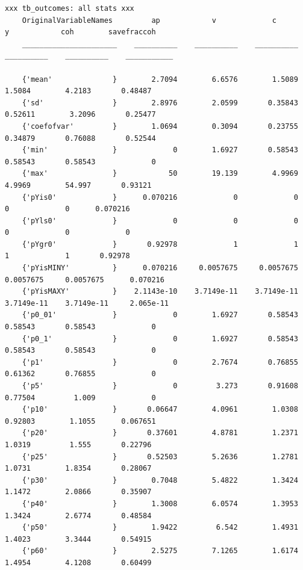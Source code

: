 \documentclass[
]{book}
\begin{document}
\begin{verbatim}
xxx tb_outcomes: all stats xxx
    OriginalVariableNames         ap            v             c             y            coh        savefraccoh
    ______________________    __________    __________    __________    __________    __________    ___________

    {'mean'              }        2.7094        6.6576        1.5089        1.5084        4.2183       0.48487 
    {'sd'                }        2.8976        2.0599       0.35843       0.52611        3.2096       0.25477 
    {'coefofvar'         }        1.0694        0.3094       0.23755       0.34879       0.76088       0.52544 
    {'min'               }             0        1.6927       0.58543       0.58543       0.58543             0 
    {'max'               }            50        19.139        4.9969        4.9969        54.997       0.93121 
    {'pYis0'             }      0.070216             0             0             0             0      0.070216 
    {'pYls0'             }             0             0             0             0             0             0 
    {'pYgr0'             }       0.92978             1             1             1             1       0.92978 
    {'pYisMINY'          }      0.070216     0.0057675     0.0057675     0.0057675     0.0057675      0.070216 
    {'pYisMAXY'          }    2.1143e-10    3.7149e-11    3.7149e-11    3.7149e-11    3.7149e-11     2.065e-11 
    {'p0_01'             }             0        1.6927       0.58543       0.58543       0.58543             0 
    {'p0_1'              }             0        1.6927       0.58543       0.58543       0.58543             0 
    {'p1'                }             0        2.7674       0.76855       0.61362       0.76855             0 
    {'p5'                }             0         3.273       0.91608       0.77504         1.009             0 
    {'p10'               }       0.06647        4.0961        1.0308       0.92803        1.1055      0.067651 
    {'p20'               }       0.37601        4.8781        1.2371        1.0319         1.555       0.22796 
    {'p25'               }       0.52503        5.2636        1.2781        1.0731        1.8354       0.28067 
    {'p30'               }        0.7048        5.4822        1.3424        1.1472        2.0866       0.35907 
    {'p40'               }        1.3008        6.0574        1.3953        1.3424        2.6774       0.48584 
    {'p50'               }        1.9422         6.542        1.4931        1.4023        3.3444       0.54915 
    {'p60'               }        2.5275        7.1265        1.6174        1.4954        4.1208       0.60499 

\end{verbatim}
\end{document}
